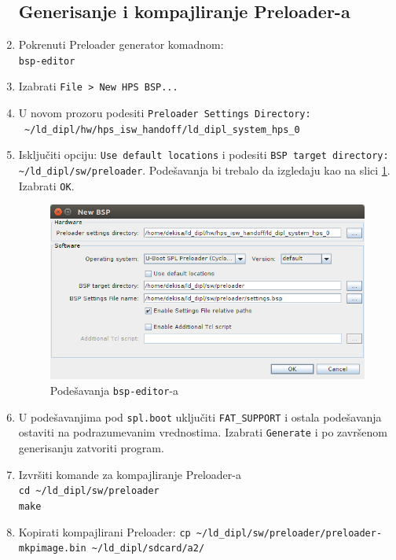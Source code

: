 \begin{enumerate}
\subsection{Generisanje i kompajliranje Preloader-a}
\item Pokrenuti Preloader generator komadnom:\\ \texttt{bsp-editor}
\item Izabrati \texttt{File > New HPS BSP...}
\item U novom prozoru podesiti \texttt{Preloader Settings Directory:} \\ \texttt{ \textasciitilde/ld\_dipl/hw/hps\_isw\_handoff/ld\_dipl\_system\_hps\_0}
\item Isključiti opciju: \texttt{Use default locations} i podesiti \texttt{BSP target directory:} \\ \texttt{\textasciitilde/ld\_dipl/sw/preloader}. Podešavanja bi trebalo da izgledaju kao na slici \ref{slika:bsp1}. Izabrati \texttt{OK}.
\begin{figure}[h!]
\centering
\includegraphics[scale=0.6]{img/bsp1.png}
\caption{Podešavanja \texttt{bsp-editor}-a}
\label{slika:bsp1}
\end{figure}
\item U podešavanjima pod \texttt{spl.boot} uključiti \texttt{FAT\_SUPPORT} i ostala podešavanja ostaviti na podrazumevanim vrednostima. Izabrati \texttt{Generate} i po završenom generisanju zatvoriti program.
\item Izvršiti komande za kompajliranje Preloader-a\\
\texttt{cd \textasciitilde/ld\_dipl/sw/preloader}\\
\texttt{make}
\item Kopirati kompajlirani Preloader:
\texttt{cp \textasciitilde/ld\_dipl/sw/preloader/preloader-mkpimage.bin \textasciitilde/ld\_dipl/sdcard/a2/}\\


\end{enumerate}
